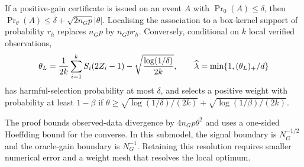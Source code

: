 \begin{theorem}\label{th:boundary}
If a positive-gain certificate is issued on an event $A$ with $\Pr_0(A)\leq\delta$, then
$\Pr_\theta(A)\leq\delta+\sqrt{2n_Gp}|\theta|$.
Localising the association to a box-kernel support of probability $r_h$ replaces $n_Gp$ by $n_Gpr_h$. Conversely, conditional on $k$ local verified observations,
\begin{equation}\label{eq:binarycert}
 \theta_L=\frac1{2k}\sum_{i=1}^k S_i(2Z_i-1)
        -\sqrt{\frac{\log(1/\delta)}{2k}},\qquad
 \widehat\lambda=\min\{1,(\theta_L)_+/d\}
\end{equation}
has harmful-selection probability at most $\delta$, and selects a positive weight with probability at least $1-\beta$ if
$\theta\geq\sqrt{\log(1/\delta)/(2k)}+\sqrt{\log(1/\beta)/(2k)}$.
\end{theorem}
The proof bounds observed-data divergence by $4n_Gp\theta^2$ and uses a one-sided Hoeffding bound for the converse.
In this submodel, the signal boundary is $N_G^{-1/2}$ and the oracle-gain boundary is $N_G^{-1}$.
Retaining this resolution requires smaller numerical error and a weight mesh that resolves the local optimum.
